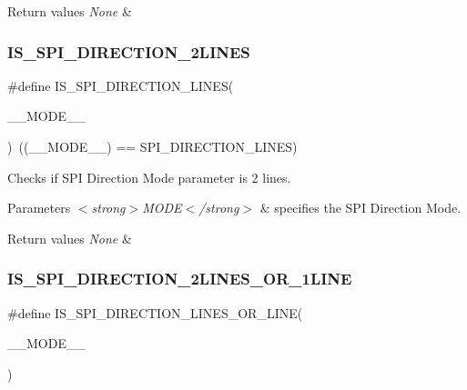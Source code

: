 \begin{DoxyRetVals}{Return values}
{\em None} & \\
\hline
\end{DoxyRetVals}
\mbox{\label{group___s_p_i___private___macros_gaff84471ab30ddd79cefd0c43dfe628c8}} 
\subsubsection{\texorpdfstring{IS\_SPI\_DIRECTION\_2LINES}{IS\_SPI\_DIRECTION\_2LINES}}
{\footnotesize\ttfamily \#define I\+S\+\_\+\+S\+P\+I\+\_\+\+D\+I\+R\+E\+C\+T\+I\+O\+N\+\_\+L\+I\+N\+ES(\begin{DoxyParamCaption}\item[{}]{\+\_\+\+\_\+\+M\+O\+D\+E\+\_\+\+\_\+ }\end{DoxyParamCaption})~((\+\_\+\+\_\+\+M\+O\+D\+E\+\_\+\+\_\+) == S\+P\+I\+\_\+\+D\+I\+R\+E\+C\+T\+I\+O\+N\+\_\+L\+I\+N\+ES)}



Checks if S\+PI Direction Mode parameter is 2 lines. 


\begin{DoxyParams}{Parameters}
{\em $<$strong$>$\+M\+O\+D\+E$<$/strong$>$} & specifies the S\+PI Direction Mode. \\
\hline
\end{DoxyParams}

\begin{DoxyRetVals}{Return values}
{\em None} & \\
\hline
\end{DoxyRetVals}
\mbox{\label{group___s_p_i___private___macros_ga525d9decc1251ec9037bd3c66c0e3a8c}} 
\subsubsection{\texorpdfstring{IS\_SPI\_DIRECTION\_2LINES\_OR\_1LINE}{IS\_SPI\_DIRECTION\_2LINES\_OR\_1LINE}}
{\footnotesize\ttfamily \#define I\+S\+\_\+\+S\+P\+I\+\_\+\+D\+I\+R\+E\+C\+T\+I\+O\+N\+\_\+L\+I\+N\+E\+S\+\_\+\+O\+R\+\_\+L\+I\+NE(\begin{DoxyParamCaption}\item[{}]{\+\_\+\+\_\+\+M\+O\+D\+E\+\_\+\+\_\+ }\end{DoxyParamCaption})}

